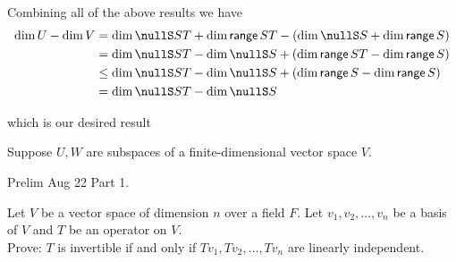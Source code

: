 \documentclass[answers]{exam}
\begin{document}
\begin{questions}
\begin{solution}
        Combining all of the above results we have
        \begin{align*}
            \dim U - \dim V &= \dim\nullS ST + \dim\range ST - \left(\dim\nullS S + \dim\range S\right) \\
            &= \dim\nullS ST - \dim\nullS S + \left(\dim\range ST - \dim\range S\right) \\
            &\leq \dim\nullS ST - \dim\nullS S + \left(\dim\range S - \dim\range S\right) \\
            &= \dim\nullS ST - \dim\nullS S
        \end{align*}

        which is our desired result
    \end{solution}
    \question Suppose $U,W$ are subspaces of a finite-dimensional vector space $V$.
    \question Prelim Aug 22 Part 1.
    \question Let $V$ be a vector space of dimension $n$ over a field $F$. Let $v_1,v_2,\dots,v_n$ be a basis of $V$ and $T$ be an operator on $V$. \\
    Prove: $T$ is invertible if and only if $Tv_1,Tv_2,\dots,Tv_n$ are linearly independent.
\end{questions}
\end{document}
